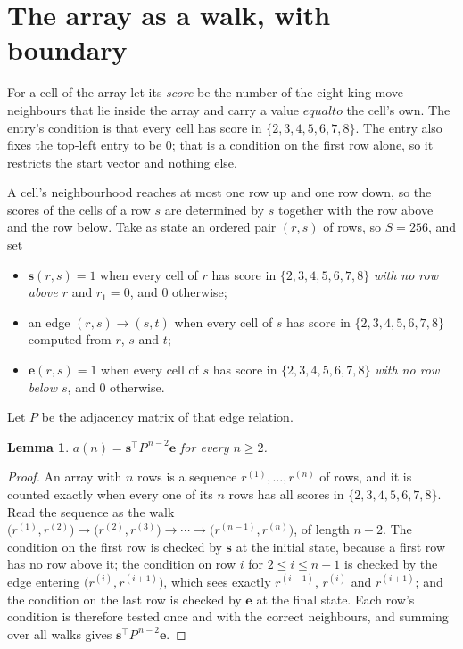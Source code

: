 \documentclass[11pt,a4paper]{article}
\theoremstyle{plain}
\newtheorem{lemma}[theorem]{Lemma}
\theoremstyle{definition}
\begin{document}
\section{The array as a walk, with boundary}

For a cell of the array let its \emph{score} be the number of the eight king-move neighbours that lie inside
the array and carry a value $equal to$ the cell's own. The entry's condition is that every cell
has score in $\{2,3,4,5,6,7,8\}$. The entry also fixes the top-left entry to be $0$; that is a condition on the first row alone, so it restricts the start vector and nothing else.

A cell's neighbourhood reaches at most one row up and one row down, so the scores of the
cells of a row $s$ are determined by $s$ together with the row above and the row below.
Take as state an ordered pair $(r,s)$ of rows, so $S=256$, and set
\begin{itemize}
\item $\mathbf{s}(r,s)=1$ when every cell of $r$ has score in $\{2,3,4,5,6,7,8\}$ \emph{with no row
above $r$} and $r_1=0$, and $0$ otherwise;
\item an edge $(r,s)\to(s,t)$ when every cell of $s$ has score in $\{2,3,4,5,6,7,8\}$ computed from
$r$, $s$ and $t$;
\item $\mathbf{e}(r,s)=1$ when every cell of $s$ has score in $\{2,3,4,5,6,7,8\}$ \emph{with no row
below $s$}, and $0$ otherwise.
\end{itemize}
Let $P$ be the adjacency matrix of that edge relation.

\begin{lemma}\label{lem:walk}
$a(n)=\mathbf{s}^{\!\top}P^{\,n-2}\mathbf{e}$ for every $n\ge2$.
\end{lemma}

\begin{proof}
An array with $n$ rows is a sequence $r^{(1)},\dots,r^{(n)}$ of rows, and it is counted
exactly when every one of its $n$ rows has all scores in $\{2,3,4,5,6,7,8\}$. Read the sequence as the
walk $\bigl(r^{(1)},r^{(2)}\bigr)\to\bigl(r^{(2)},r^{(3)}\bigr)\to\cdots\to
\bigl(r^{(n-1)},r^{(n)}\bigr)$, of length $n-2$. The condition on the first row is
checked by $\mathbf{s}$ at the initial state, because a first row has no row above it; the
condition on row $i$ for $2\le i\le n-1$ is checked by the edge entering
$\bigl(r^{(i)},r^{(i+1)}\bigr)$, which sees exactly $r^{(i-1)}$, $r^{(i)}$ and
$r^{(i+1)}$; and the condition on the last row is checked by $\mathbf{e}$ at the final
state. Each row's condition is therefore tested once and with the correct neighbours, and
summing over all walks gives $\mathbf{s}^{\!\top}P^{\,n-2}\mathbf{e}$.
\end{proof}
\end{document}
